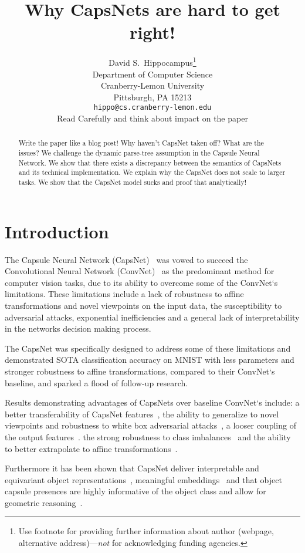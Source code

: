 \documentclass{article}
\title{                                                                                                                                          
	Why CapsNets are hard to get right!
}
\author{%
  David S.~Hippocampus\thanks{Use footnote for providing further information
    about author (webpage, alternative address)---\emph{not} for acknowledging
    funding agencies.} \\
  Department of Computer Science\\
  Cranberry-Lemon University\\
  Pittsburgh, PA 15213 \\
  \texttt{hippo@cs.cranberry-lemon.edu} \\Read Carefully and think about impact on the paper
}
\begin{document}
\maketitle

\begin{abstract}
  Write the paper like a blog post!
  Why haven't CapsNet taken off? What are the issues?
  We challenge the dynamic parse-tree assumption in the Capsule Neural Network.
  We show that there exists a discrepancy between the semantics of CapsNets and its technical implementation.
  We explain why the CapsNet does not scale to larger tasks.
  We show that the CapsNet model sucks and proof that analytically!
\end{abstract}

\section{Introduction}

The Capsule Neural Network (CapsNet)~\cite{nips/SabourFH17} was vowed to succeed the Convolutional Neural Network (ConvNet)~\cite{neco/LeCunBDHHHJ89} as the predominant method for computer vision tasks, due to its ability to overcome some of the ConvNet`s limitations. %
These limitations include
a lack of robustness to affine transformations and novel viewpoints on the input data, 
the susceptibility to adversarial attacks,
exponential inefficiencies
and a general lack of interpretability in the networks decision making process. %

The CapsNet was specifically designed to address some of these limitations and demonstrated SOTA classification accuracy on MNIST with less parameters and stronger robustness to affine transformations, compared to their ConvNet`s baseline, and sparked a flood of follow-up research.

Results demonstrating advantages of CapsNets over baseline ConvNet`s include:
a better transferability of CapsNet features~\cite{corr/Ancheng2018},
the ability to generalize to novel viewpoints and robustness to white box adversarial attacks~\cite{iclr/HintonSF18},
a looser coupling of the output features~\cite{corr/Lin2018}.
the strong robustness to class imbalances~\cite{miccai/Jimenez-Sanchez18} and
the ability to better extrapolate to affine transformations~\cite{cvpr/GuT20}.

Furthermore it has been shown that CapsNet deliver interpretable and equivariant object representations~\cite{nips/LenssenFL18}, meaningful embeddings~\cite{corr/Lin2018} and that object capsule presences are highly informative of the object class and allow for geometric reasoning~\cite{nips/KosiorekSTH19}.
\end{document}
